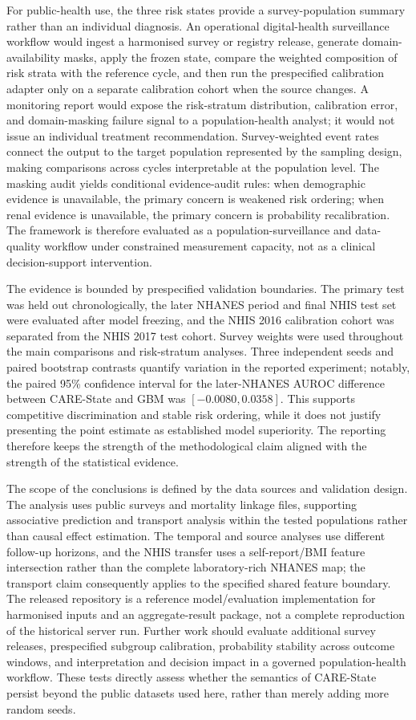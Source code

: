 \documentclass[12pt]{article}
\begin{document}
For public-health use, the three risk states provide a survey-population summary rather than an individual diagnosis. An operational digital-health surveillance workflow would ingest a harmonised survey or registry release, generate domain-availability masks, apply the frozen state, compare the weighted composition of risk strata with the reference cycle, and then run the prespecified calibration adapter only on a separate calibration cohort when the source changes. A monitoring report would expose the risk-stratum distribution, calibration error, and domain-masking failure signal to a population-health analyst; it would not issue an individual treatment recommendation. Survey-weighted event rates connect the output to the target population represented by the sampling design, making comparisons across cycles interpretable at the population level. The masking audit yields conditional evidence-audit rules: when demographic evidence is unavailable, the primary concern is weakened risk ordering; when renal evidence is unavailable, the primary concern is probability recalibration. The framework is therefore evaluated as a population-surveillance and data-quality workflow under constrained measurement capacity, not as a clinical decision-support intervention.

The evidence is bounded by prespecified validation boundaries. The primary test was held out chronologically, the later NHANES period and final NHIS test set were evaluated after model freezing, and the NHIS 2016 calibration cohort was separated from the NHIS 2017 test cohort. Survey weights were used throughout the main comparisons and risk-stratum analyses. Three independent seeds and paired bootstrap contrasts quantify variation in the reported experiment; notably, the paired 95\% confidence interval for the later-NHANES AUROC difference between CARE-State and GBM was $[-0.0080,0.0358]$. This supports competitive discrimination and stable risk ordering, while it does not justify presenting the point estimate as established model superiority. The reporting therefore keeps the strength of the methodological claim aligned with the strength of the statistical evidence.

The scope of the conclusions is defined by the data sources and validation design. The analysis uses public surveys and mortality linkage files, supporting associative prediction and transport analysis within the tested populations rather than causal effect estimation. The temporal and source analyses use different follow-up horizons, and the NHIS transfer uses a self-report/BMI feature intersection rather than the complete laboratory-rich NHANES map; the transport claim consequently applies to the specified shared feature boundary. The released repository is a reference model/evaluation implementation for harmonised inputs and an aggregate-result package, not a complete reproduction of the historical server run. Further work should evaluate additional survey releases, prespecified subgroup calibration, probability stability across outcome windows, and interpretation and decision impact in a governed population-health workflow. These tests directly assess whether the semantics of CARE-State persist beyond the public datasets used here, rather than merely adding more random seeds.
\end{document}
